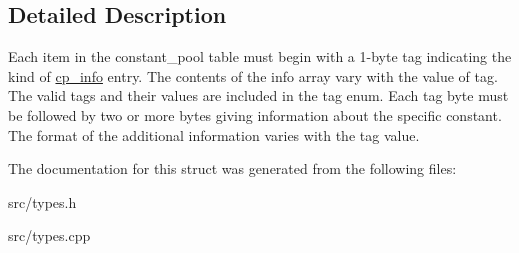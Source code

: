\subsection{Detailed Description}
Each item in the constant\+\_\+pool table must begin with a 1-\/byte tag indicating the kind of \hyperlink{structcp__info}{cp\+\_\+info} entry. The contents of the info array vary with the value of tag. The valid tags and their values are included in the tag enum. Each tag byte must be followed by two or more bytes giving information about the specific constant. The format of the additional information varies with the tag value. 

The documentation for this struct was generated from the following files\+:\begin{DoxyCompactItemize}
\item 
src/types.\+h\item 
src/types.\+cpp\end{DoxyCompactItemize}
